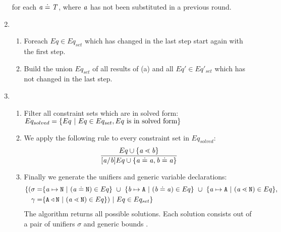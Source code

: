 \begin{enumerate}
      for each $\mathit{ a } \doteq \mathit{T}$, where $\mathit{ a }$ has not been substituted in a previous round.

\item 
    \begin{enumerate}
    \item Foreach $Eq \in Eq_{set}$ which has changed in the last step
      start again with the first step.
    \item Build the union $Eq_{set}$ of all results of (a) and all $Eq' \in
      Eq'_{set}$ which has not changed in the last step.
    \end{enumerate}
\item
\begin{enumerate}
  \item Filter all constraint sets which are in solved
  form:\\
$Eq_{solved} = \{  Eq \ | \ Eq \in Eq_{set}, Eq \ \text{is in solved form} \}$
\item We apply the following rule to every constraint set in $Eq_{solved}$:
\begin{align*}
\ddfrac{
  Eq \cup \set{ \tv{a} \lessdot \tv{b} } %
}{
  [\tv{a}/\tv{b}]Eq \cup \set{ \tv{a} \doteq \tv{a}, \tv{b} \doteq \tv{a} }
}
\end{align*}
\item Finally we generate the unifiers and generic variable declarations:
\begin{align*}
  \set{ 
    (\sigma = &
    \set{\tv{a} \mapsto \type{N} \ | \ (\tv{a} \doteq \type{N}) \in Eq} \ \cup \  \set{\tv{b} \mapsto \type{A} \ | \ (\tv{b} \doteq \tv{a}) \in Eq} \ \cup \ 
    \set{\tv{a} \mapsto \type{A} \ | \ (\tv{a} \lessdot \type{N}) \in Eq }, \\
   \unifyGenerics{} = &
  \set{\type{A} \triangleleft \type{N} \ | \ (\tv{a} \lessdot \type{N}) \in Eq}) 
   \ | \ Eq \in Eq_{set}  }
\end{align*}
The \unify{} algorithm returns all possible solutions.
Each solution consists out of a pair of unifiers $\sigma$ and generic bounds \unifyGenerics{}.
\end{enumerate}
\end{enumerate}
\fi


